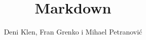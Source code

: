 \documentclass{beamer}
\begin{document}
\title{\huge Markdown}
\author{Deni Klen, Fran Grenko i Mihael Petranović}
\maketitle
\end{document}
